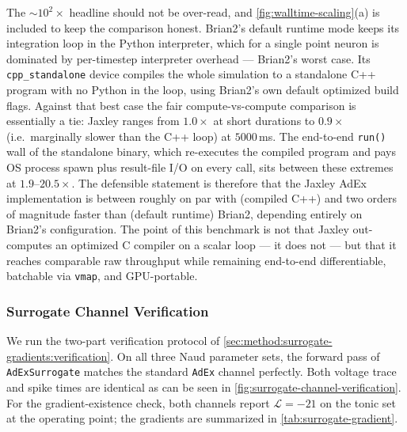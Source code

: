 The $\sim\!10^2\times$ headline should not be over-read, and \cref{fig:walltime-scaling}(a) is included to keep the comparison honest.
Brian2's default runtime mode keeps its integration loop in the Python interpreter, which for a single point neuron is dominated by per-timestep interpreter overhead --- Brian2's worst case.
Its \texttt{cpp\_standalone} device compiles the whole simulation to a standalone C++ program with no Python in the loop, using Brian2's own default optimized build flags.
Against that best case the fair compute-vs-compute comparison is essentially a tie:
Jaxley ranges from $1.0\times$ at short durations to $0.9\times$ (i.e.\ marginally slower than the C++ loop) at $5000$\,ms.
The end-to-end \texttt{run()} wall of the standalone binary, which re-executes the compiled program and pays OS process spawn plus result-file I/O on every call,
sits between these extremes at $1.9$--$20.5\times$.
The defensible statement is therefore that the Jaxley \gls{AdEx} implementation is between roughly on par with (compiled C++) and two orders of magnitude faster than (default runtime) Brian2,
depending entirely on Brian2's configuration.
The point of this benchmark is not that Jaxley out-computes an optimized C compiler on a scalar loop --- it does not ---
but that it reaches comparable raw throughput while remaining end-to-end differentiable, batchable via \texttt{vmap}, and GPU-portable.

\subsubsection{Surrogate Channel Verification}\label{sec:results:verification:surrogate}

We run the two-part verification protocol of \cref{sec:method:surrogate-gradients:verification}.
On all three Naud parameter sets, the forward pass of \texttt{AdExSurrogate} matches the standard \texttt{AdEx} channel perfectly.
Both voltage trace and spike times are identical as can be seen in \cref{fig:surrogate-channel-verification}.
For the gradient-existence check, both channels report $\mathcal{L} = -21$ on the tonic set at the operating point; the gradients are summarized in \cref{tab:surrogate-gradient}.

